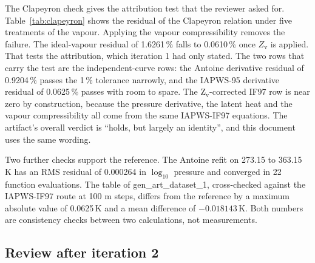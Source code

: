 \documentclass[11pt,letterpaper]{article}
\begin{document}


The Clapeyron check gives the attribution test that the reviewer asked for. Table~\ref{tab:clapeyron} shows the residual of the Clapeyron relation under five treatments of the vapour. Applying the vapour compressibility removes the failure. The ideal-vapour residual of 1.6261\,\% falls to 0.0610\,\% once $Z_\mathrm{v}$ is applied. That tests the attribution, which iteration 1 had only stated. The two rows that carry the test are the independent-curve rows: the Antoine derivative residual of 0.9204\,\% passes the 1\,\% tolerance narrowly, and the IAPWS-95 derivative residual of 0.0625\,\% passes with room to spare. The Z$_\mathrm{v}$-corrected IF97 row is near zero by construction, because the pressure derivative, the latent heat and the vapour compressibility all come from the same IAPWS-IF97 equations. The artifact's overall verdict is ``holds, but largely an identity'', and this document uses the same wording.



Two further checks support the reference. The Antoine refit on 273.15 to 363.15 K has an RMS residual of 0.000264 in $\log_{10}$ pressure and converged in 22 function evaluations. The table of gen\_art\_dataset\_1, cross-checked against the IAPWS-IF97 route at 100 m steps, differs from the reference by a maximum absolute value of 0.0625\,K and a mean difference of $-0.018143$\,K. Both numbers are consistency checks between two calculations, not measurements.

\subsection{Review after iteration 2}
\end{document}

